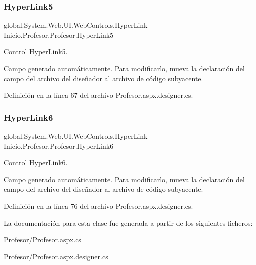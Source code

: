 \subsubsection{\texorpdfstring{HyperLink5}{HyperLink5}}
{\footnotesize\ttfamily global.\+System.\+Web.\+U\+I.\+Web\+Controls.\+Hyper\+Link Inicio.\+Profesor.\+Profesor.\+Hyper\+Link5\hspace{0.3cm}{\ttfamily [protected]}}



Control Hyper\+Link5. 

Campo generado automáticamente. Para modificarlo, mueva la declaración del campo del archivo del diseñador al archivo de código subyacente. 

Definición en la línea 67 del archivo Profesor.\+aspx.\+designer.\+cs.

\mbox{\label{classInicio_1_1Profesor_1_1Profesor_ab97897a5f96e1b0a1479df3f8d36c3c5}} 
\subsubsection{\texorpdfstring{HyperLink6}{HyperLink6}}
{\footnotesize\ttfamily global.\+System.\+Web.\+U\+I.\+Web\+Controls.\+Hyper\+Link Inicio.\+Profesor.\+Profesor.\+Hyper\+Link6\hspace{0.3cm}{\ttfamily [protected]}}



Control Hyper\+Link6. 

Campo generado automáticamente. Para modificarlo, mueva la declaración del campo del archivo del diseñador al archivo de código subyacente. 

Definición en la línea 76 del archivo Profesor.\+aspx.\+designer.\+cs.



La documentación para esta clase fue generada a partir de los siguientes ficheros\+:\begin{DoxyCompactItemize}
\item 
Profesor/\mbox{\hyperlink{Profesor_8aspx_8cs}{Profesor.\+aspx.\+cs}}\item 
Profesor/\mbox{\hyperlink{Profesor_8aspx_8designer_8cs}{Profesor.\+aspx.\+designer.\+cs}}\end{DoxyCompactItemize}
